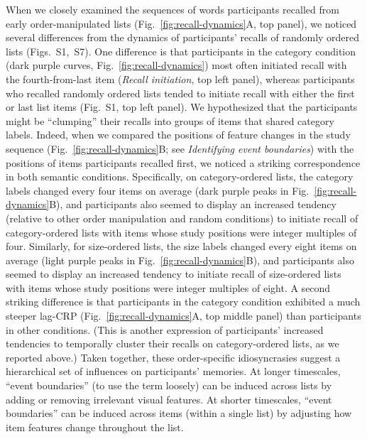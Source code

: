 \documentclass[11pt]{article}
\newcommand{\dynamicsRandom}{S1}
\newcommand{\recallInit}{S7}
\begin{document}
When we closely examined the sequences of words participants recalled from
early order-manipulated lists (Fig.~\ref{fig:recall-dynamics}A, top panel), we
noticed several differences from the dynamics of participants' recalls of
randomly ordered lists (Figs.~\dynamicsRandom,~\recallInit). One difference is
that participants in the category condition (dark purple curves,
Fig.~\ref{fig:recall-dynamics}) most often initiated recall with the
fourth-from-last item (\textit{Recall initiation}, top left panel), whereas
participants who recalled randomly ordered lists tended to initiate recall with
either the first or last list items (Fig.~\dynamicsRandom, top left panel). We
hypothesized that the participants might be ``clumping'' their recalls into
groups of items that shared category labels. Indeed, when we compared the
positions of feature changes in the study sequence
(Fig.~\ref{fig:recall-dynamics}B; see \textit{Identifying event boundaries})
with the positions of items participants recalled first, we noticed a striking
correspondence in both semantic conditions. Specifically, on category-ordered
lists, the category labels changed every four items on average (dark purple
peaks in Fig.~\ref{fig:recall-dynamics}B), and participants also seemed to
display an increased tendency (relative to other order manipulation and random
conditions) to initiate recall of category-ordered lists with items whose study
positions were integer multiples of four. Similarly, for size-ordered lists,
the size labels changed every eight items on average (light purple peaks in
Fig.~\ref{fig:recall-dynamics}B), and participants also seemed to display an
increased tendency to initiate recall of size-ordered lists with items whose
study positions were integer multiples of eight. A second striking difference
is that participants in the category condition exhibited a much steeper lag-CRP
(Fig.~\ref{fig:recall-dynamics}A, top middle panel) than participants in other
conditions. (This is another expression of participants' increased tendencies
to temporally cluster their recalls on category-ordered lists, as we reported
above.) Taken together, these order-specific idiosyncrasies suggest a
hierarchical set of influences on participants' memories. At longer timescales,
``event boundaries'' (to use the term loosely) can be induced across lists by
adding or removing irrelevant visual features. At shorter timescales, ``event
boundaries'' can be induced across items (within a single list) by adjusting
how item features change throughout the list.
\end{document}
